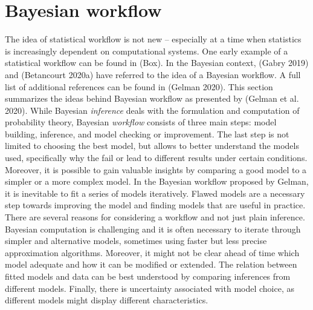 \section{Bayesian workflow}

The idea of statistical workflow is not new – especially at a time when statistics is increasingly dependent on computational systems. One early example of a statistical workflow can be found in (Box).
In the Bayesian context, (Gabry 2019) and (Betancourt 2020a) have referred to the idea of a Bayesian workflow.
A full list of additional references can be found in (Gelman 2020).
This section summarizes the ideas behind Bayesian workflow as presented by (Gelman et al. 2020).
While Bayesian \textit{inference} deals with the formulation and computation of probability theory, Bayesian \textit{workflow} consists of three main steps: model building, inference, and model checking or improvement.
The last step is not limited to choosing the best model, but allows to better understand the models used, specifically why the fail or lead to different results under certain conditions.
Moreover, it is possible to gain valuable insights by comparing a good model to a simpler or a more complex model.
In the Bayesian workflow proposed by Gelman, it is inevitable to fit a series of models iteratively.
Flawed models are a necessary step towards improving the model and finding models that are useful in practice.
There are several reasons for considering a workflow and not just plain inference.
Bayesian computation is challenging and it is often necessary to iterate through simpler and alternative models, sometimes using faster but less precise approximation algorithms.
Moreover, it might not be clear ahead of time which model adequate and how it can be modified or extended.
The relation between fitted models and data can be best understood by comparing inferences from different models.
Finally, there is uncertainty associated with model choice, as different models might display different characteristics.


